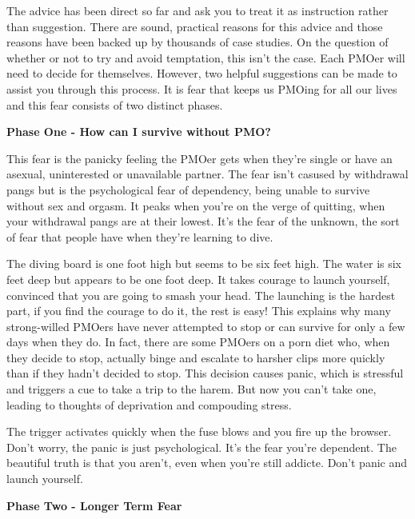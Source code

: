 \documentclass[easypeasy.tex]{subfiles}
\begin{document}
The advice has been direct so far and ask you to treat it as instruction rather than suggestion. There are sound, practical reasons for this advice and those reasons have been backed up by thousands of case studies. On the question of whether or not to try and avoid temptation, this isn't the case. Each PMOer will need to decide for themselves. However, two helpful suggestions can be made to assist you through this process. It is fear that keeps us PMOing for all our lives and this fear consists of two distinct phases.

\textbf{Phase One - How can I survive without PMO?}

This fear is the panicky feeling the PMOer gets when they're single or have an asexual, uninterested or unavailable partner. The fear isn't casused by withdrawal pangs but is the psychological fear of dependency, being unable to survive without sex and orgasm. It peaks when you're on the verge of quitting, when your withdrawal pangs are at their lowest. It's the fear of the unknown, the sort of fear that people have when they're learning to dive.

The diving board is one foot high but seems to be six feet high. The water is six feet deep but appears to be one foot deep. It takes courage to launch yourself, convinced that you are going to smash your head. The launching is the hardest part, if you find the courage to do it, the rest is easy! This explains why many strong-willed PMOers have never attempted to stop or can survive for only a few days when they do. In fact, there are some PMOers on a porn diet who, when they decide to stop, actually binge and escalate to harsher clips more quickly than if they hadn't decided to stop. This decision causes panic, which is stressful and triggers a cue to take a trip to the harem. But now you can't take one, leading to thoughts of deprivation and compouding stress.

The trigger activates quickly when the fuse blows and you fire up the browser. Don't worry, the panic is just psychological. It's the fear you're dependent. The beautiful truth is that you aren't, even when you're still addicte. Don't panic and launch yourself.

\textbf{Phase Two - Longer Term Fear}
\end{document}
